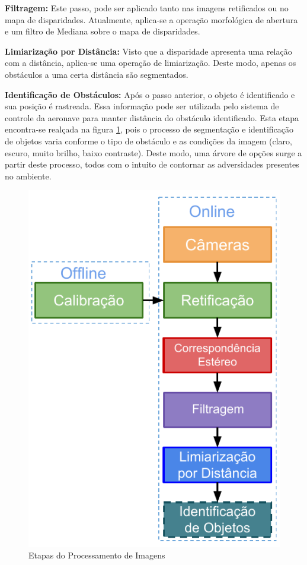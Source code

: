 \textbf{Filtragem:} Este passo, pode ser aplicado tanto nas imagens retificados ou no mapa de disparidades. Atualmente, aplica-se a operação morfológica de abertura e um filtro de Mediana sobre o mapa de disparidades. 

\textbf{Limiarização por Distância:} Visto que a disparidade apresenta uma relação com a distância, aplica-se uma operação de limiarização. Deste modo, apenas os obstáculos a uma certa distância são segmentados.

\textbf{Identificação de Obstáculos:} Após o passo anterior, o objeto é identificado e sua posição é rastreada. Essa informação pode ser utilizada pelo sistema de controle da aeronave para manter distância do obstáculo identificado. Esta etapa encontra-se realçada na figura \ref{stereo_processor_steps}, pois o processo de segmentação e identificação de objetos varia conforme o tipo de obstáculo e as condições da imagem (claro, escuro, muito brilho, baixo contraste). Deste modo, uma árvore de opções surge a partir deste processo, todos com o intuito de contornar as adversidades presentes no ambiente.

\begin{figure}[H]
	\centering
	\includegraphics[scale=1.0]{./Resources/stereo_processor_steps3.pdf}
	\caption{Etapas do Processamento de Imagens}
	\label{stereo_processor_steps}
\end{figure}


